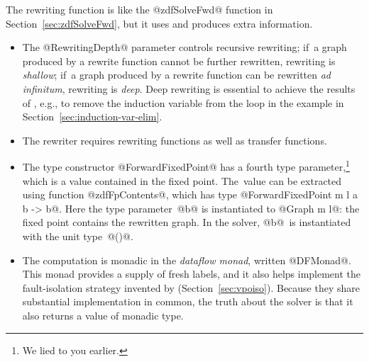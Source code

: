 \documentclass[blockstyle,preprint,nocopyrightspace]{sigplanconf}
\newcommand{\authornote}[1]{{\em #1}}
\def\authornote#1{\unskip\relax}
\newcommand{\simon}[1]{\authornote{SLPJ: #1}}
\newcommand\secref[1]{Section~\ref{sec:#1}}
\newcommand\seclabel[1]{\label{sec:#1}}
\begin{document}
\simon{But do we apply rewrites even before the analysis reaches a fixed point?
If so, what property do the rewrites have to satisfy to ensure soundness?
If not, even a single rewrite might destroy the fixed-point property of the
current facts.  Or perhaps we iterate the analysis to a fixpoint, and only \emph{then}
do rewriting? If so, do we need the transfer functions at that stage?

Also the fixed-point of the analysis relies on upward chains. What if
the rewrite pushed it downward?  Or is it the case that a rewrite must
change a node $n$ into a graph $g$ so 
that $\mathit{fwdtrans}(n) \leq \mathit{fwdtrans}(g)$?

Also the fixpoint calculation requires multiple passses; do the 
rewrites then apply multiple times?

I'm deliberately playing the role of the reader here, and not peeking at
the code.  I don't think it's enough to say ``go look at Chambers paper''; 
I suggest we say enough (half a column would do it) to address the obvious
questions and point to Chambers for details.


\textbf{NR}: Good questions, but let's have a forward reference to \secref{dfengine}}

The rewriting function is like the @zdfSolveFwd@ function in
\secref{zdfSolveFwd}, but it uses and produces extra
information.\seclabel{engine-truth} 
\begin{itemize}
\item
The @RewritingDepth@ parameter controls recursive rewriting;
if~a graph produced by a rewrite function cannot be further rewritten,
rewriting is \emph{shallow};
if~a graph produced by a rewrite function can be rewritten \emph{ad
infinitum}, rewriting is \emph{deep}.
Deep rewriting is essential to achieve the results of
\citet{lerner-grove-chambers:2002}, e.g., to remove the induction
variable from the loop in the example in \secref{induction-var-elim}.
\item
The rewriter requires rewriting functions as well as transfer
functions.
\item
The type constructor @ForwardFixedPoint@ has a fourth
type parameter,\footnote
{We lied to you earlier.}
which is a value contained in the fixed point.
The~value can be extracted using function @zdfFpContents@, which has
type @ForwardFixedPoint m l a b -> b@.
Here the type parameter~@b@ is instantiated to @Graph m l@: the fixed point
contains the rewritten graph.
In the solver, @b@~is instantiated with
the unit type~@()@. \simon{I'm afraid I do not understand this bullet
at all.}
\item
The computation is monadic in the \emph{dataflow monad}, written
@DFMonad@.
This monad provides a supply of fresh labels, and it
also helps implement the fault-isolation strategy invented by
\citet{whalley:isolation} (\secref{vpoiso}).
Because they share substantial implementation in common, the truth
about the solver is that it also returns a value of monadic type.
\end{itemize}
\end{document}
